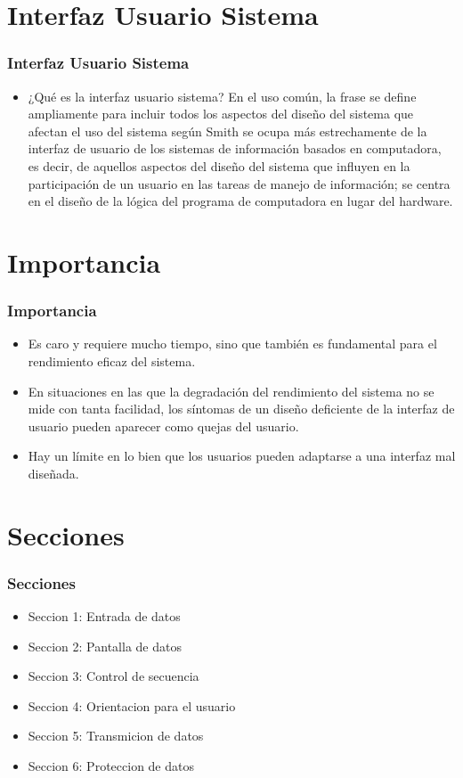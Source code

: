 \documentclass[11pt]{beamer}
\begin{document}
\section{Interfaz Usuario Sistema}
\begin{frame}
\frametitle{Interfaz Usuario Sistema}
\begin{itemize}
\item ¿Qué es la interfaz usuario sistema? En el uso común, la frase se define ampliamente para incluir todos los aspectos del diseño del sistema que afectan el uso del sistema según Smith se ocupa más estrechamente de la interfaz de usuario de los sistemas de información basados en computadora, es decir, de aquellos aspectos del diseño del sistema que influyen en la participación de un usuario en las tareas de manejo de información; se centra en el diseño de la lógica del programa de computadora en lugar del hardware.
\end{itemize}
\end{frame}

\section{Importancia}
\begin{frame}
\frametitle{Importancia}
\begin{itemize}
\item Es caro y requiere mucho tiempo, sino que también es fundamental para el rendimiento eficaz del sistema.
\item En situaciones en las que la degradación del rendimiento del sistema no se mide con tanta facilidad, los síntomas de un diseño deficiente de la interfaz de usuario pueden aparecer como quejas del usuario. 
\item Hay un límite en lo bien que los usuarios pueden adaptarse a una interfaz mal diseñada. 
\end{itemize}
\end{frame}

\section{Secciones}
\begin{frame}
\frametitle{Secciones}
\begin{itemize}
\item Seccion 1: Entrada de datos
\item Seccion 2: Pantalla de datos
\item Seccion 3: Control de secuencia
\item Seccion 4: Orientacion para el usuario
\item Seccion 5: Transmicion de datos
\item Seccion 6: Proteccion de datos
\end{itemize}
\end{frame}
\end{document}
